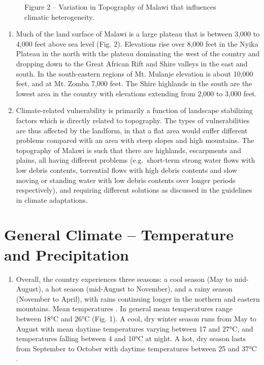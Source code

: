 \documentclass[
]{book}
\providecommand{\tightlist}{%
  \setlength{\itemsep}{0pt}\setlength{\parskip}{0pt}}
\begin{document}
\begin{figure}
\caption{Figure 2 -- Variation in Topography of Malawi that influences climatic heterogeneity.}
\end{figure}

\begin{enumerate}
\def\labelenumi{\arabic{enumi}.}
\setcounter{enumi}{15}
\item
  Much of the land surface of Malawi is a large plateau that is between 3,000 to 4,000 feet above sea level (Fig. 2). Elevations rise over 8,000 feet in the Nyika Plateau in the north with the plateau dominating the west of the country and dropping down to the Great African Rift and Shire valleys in the east and south. In the south-eastern regions of Mt. Mulanje elevation is about 10,000 feet, and at Mt. Zomba 7,000 feet. The Shire highlands in the south are the lowest area in the country with elevations extending from 2,000 to 3,000 feet.
\item
  Climate-related vulnerability is primarily a function of landscape stabilizing factors which is directly related to topography. The types of vulnerabilities are thus affected by the landform, in that a flat area would suffer different problems compared with an area with steep slopes and high mountains. The topography of Malawi is such that there are highlands, escarpments and plains, all having different problems (e.g.~short-term strong water flows with low debris contents, torrential flows with high debris contents and slow moving or standing water with low debris contents over longer periods respectively), and requiring different solutions as discussed in the guidelines in climate adaptations.
\end{enumerate}

\hypertarget{general-climate-temperature-and-precipitation}{%
\section{General Climate -- Temperature and Precipitation}\label{general-climate-temperature-and-precipitation}}

\begin{enumerate}
\def\labelenumi{\arabic{enumi}.}
\setcounter{enumi}{17}
\tightlist
\item
  Overall, the country experiences three seasons: a cool season (May to mid-August), a hot season (mid-August to November), and a rainy season (November to April), with rains continuing longer in the northern and eastern mountains. Mean temperatures . In general mean temperatures range between 18°C and 26°C (Fig. 1). A cool, dry winter season runs from May to August with mean daytime temperatures varying between 17 and 27°C, and temperatures falling between 4 and 10°C at night. A hot, dry season lasts from September to October with daytime temperatures between 25 and 37°C .
\end{enumerate}
\end{document}

